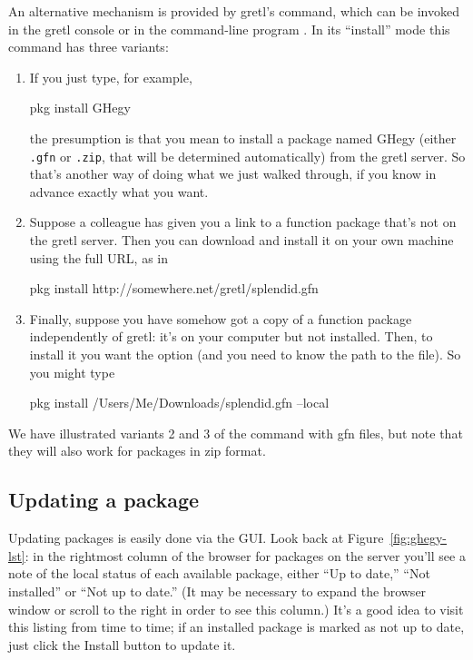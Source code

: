 \documentclass[oneside]{book}
\begin{document}
An alternative mechanism is provided by gretl's  command,
which can be invoked in the gretl console or in the command-line
program . In its ``install'' mode this command has three
variants:

\begin{enumerate}
\item If you just type, for example,
%
\begin{code}
pkg install GHegy
\end{code}
%
  the presumption is that you mean to install a package named
  \textsf{GHegy} (either \texttt{.gfn} or \texttt{.zip}, that will be
  determined automatically) from the gretl server. So that's another
  way of doing what we just walked through, if you know in advance
  exactly what you want.
\item Suppose a colleague has given you a link to a function package
  that's not on the gretl server. Then you can download and install it
  on your own machine using the full URL, as in
%
\begin{code}
pkg install http://somewhere.net/gretl/splendid.gfn
\end{code}
%
\item Finally, suppose you have somehow got a copy of a function
  package independently of gretl: it's on your computer but not
  installed.  Then, to install it you want the  option
  (and you need to know the path to the file). So you might type
%
\begin{code}
pkg install /Users/Me/Downloads/splendid.gfn --local
\end{code}
%
\end{enumerate}

We have illustrated variants 2 and 3 of the  command
with \textsf{gfn} files, but note that they will also work for
packages in \textsf{zip} format.

\subsection{Updating a package}

Updating packages is easily done via the GUI. Look back at
Figure~\ref{fig:ghegy-lst}: in the rightmost column of the browser for
packages on the server you'll see a note of the local status of each
available package, either ``Up to date,'' ``Not installed'' or ``Not
up to date.'' (It may be necessary to expand the browser window or
scroll to the right in order to see this column.) It's a good idea to
visit this listing from time to time; if an installed package is
marked as not up to date, just click the Install button to update it.
\end{document}
